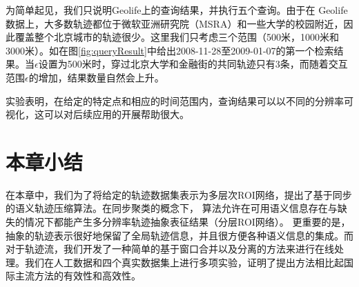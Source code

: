 为简单起见，我们只说明Geolife上的查询结果，并执行五个查询。由于在 Geolife数据上，大多数轨迹都位于微软亚洲研究院（MSRA）和一些大学的校园附近，因此覆盖整个北京城市的轨迹很少。这里我们只考虑三个范围（500米，1000米和3000米）。如在图\ref{fig:queryResult}中给出2008-11-28至2009-01-07的第一个检索结果。当$\epsilon$设置为500米时，穿过北京大学和金融街的共同轨迹只有3条，而随着交互范围$ \epsilon $的增加，结果数量自然会上升。

实验表明，在给定的特定点和相应的时间范围内，查询结果可以以不同的分辨率可视化，这可以对后续应用的开展帮助很大。

\section{本章小结}
在本章中，我们为了将给定的轨迹数据集表示为多层次ROI网络，提出了基于同步的语义轨迹压缩算法\CascadeSync。在同步聚类的概念下，\CascadeSync
算法允许在可用语义信息存在与缺失的情况下都能产生多分辨率轨迹抽象表征结果（分层ROI网络）。 更重要的是，抽象的轨迹表示很好地保留了全局轨迹信息，并且很方便各种语义信息的集成。而对于轨迹流，我们开发了一种简单的基于窗口合并以及分离的方法来进行在线处理。我们在人工数据和四个真实数据集上进行多项实验，证明了提出方法相比起国际主流方法的有效性和高效性。
\newpage\mbox{}\thispagestyle{empty}\newpage
